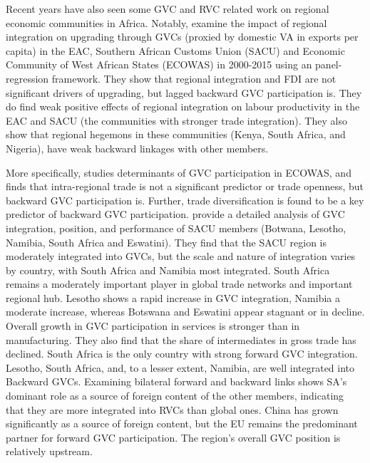 \documentclass[a4paper]{article}
\begin{document}
Recent years have also seen some GVC and RVC related work on regional economic communities in Africa. Notably, \citet{obasaju2021regional} examine the impact of regional integration on upgrading through GVCs (proxied by domestic VA in exports per capita) in the EAC, Southern African Customs Union (SACU) and Economic Community of West African States (ECOWAS) in 2000-2015 using an panel-regression framework. They show that regional integration and FDI are not significant drivers of upgrading, but lagged backward GVC participation is. They do find weak positive effects of regional integration on labour productivity in the EAC and SACU (the communities with stronger trade integration). They also show that regional hegemons in these communities (Kenya, South Africa, and Nigeria), have weak backward linkages with other members. \newline 

More specifically, \citet{tinta2017determinants} studies determinants of GVC participation in ECOWAS, and finds that intra-regional trade is not a significant predictor or trade openness, but backward GVC participation is. Further, trade diversification is found to be a key predictor of backward GVC participation. \citet{engel2016sacu} provide a detailed analysis of GVC integration, position, and performance of SACU members (Botwana, Lesotho, Namibia, South Africa and Eswatini). They find that the SACU region is moderately integrated into GVCs, but the scale and nature of integration varies by country, with South Africa and Namibia most integrated. South Africa remains a moderately important player in global trade networks and important regional hub. Lesotho shows a rapid increase in GVC integration, Namibia a moderate increase, whereas Botswana and Eswatini appear stagnant or in decline. Overall growth in GVC participation in services is stronger than in manufacturing. They also find that  the share of intermediates in gross trade has declined. South Africa is the only country with strong forward GVC integration. Lesotho, South Africa, and, to a lesser extent, Namibia, are well integrated into Backward GVCs. Examining bilateral forward and backward links shows SA's dominant role as a source of foreign content of the other members, indicating that they are more integrated into RVCs than global ones. China has grown significantly as a source of foreign content, but the EU remains the predominant partner for forward GVC participation. The region's overall GVC position is relatively upstream. 
 \newline 
\end{document}
